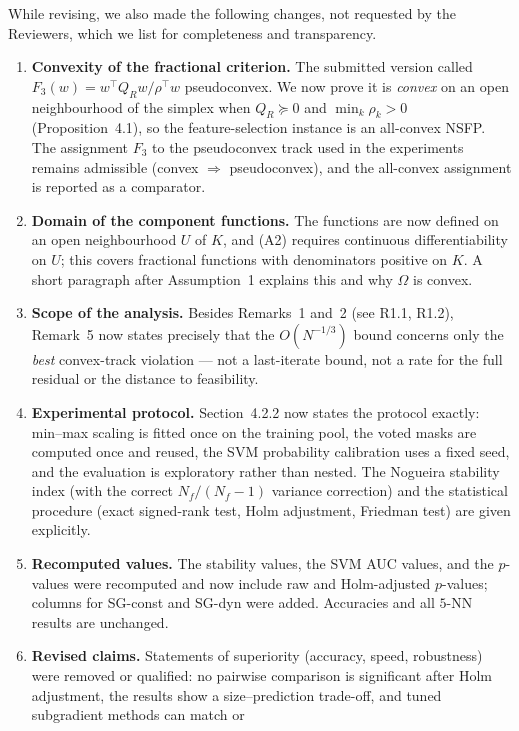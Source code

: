 \documentclass[11pt]{article}
\begin{document}
\noindent While revising, we also made the following changes, not requested by the
Reviewers, which we list for completeness and transparency.
\begin{enumerate}[leftmargin=1.6em,itemsep=3pt]
\item \textbf{Convexity of the fractional criterion.} The submitted version called
  $F_3(w)=w^{\top}Q_Rw/\rho^{\top}w$ pseudoconvex. We now prove it is \emph{convex} on an
  open neighbourhood of the simplex when $Q_R\succeq0$ and $\min_k\rho_k>0$
  (Proposition~4.1), so the feature-selection instance is an all-convex NSFP. The
  assignment $F_3$ to the pseudoconvex track used in the experiments remains admissible
  (convex $\Rightarrow$ pseudoconvex), and the all-convex assignment is reported as a
  comparator.
\item \textbf{Domain of the component functions.} The functions are now defined on an open
  neighbourhood $U$ of $K$, and (A2) requires continuous differentiability on $U$; this
  covers fractional functions with denominators positive on $K$. A short paragraph after
  Assumption~1 explains this and why $\Omega$ is convex.
\item \textbf{Scope of the analysis.} Besides Remarks~1 and~2 (see R1.1, R1.2), Remark~5
  now states precisely that the $O(N^{-1/3})$ bound concerns only the \emph{best}
  convex-track violation --- not a last-iterate bound, not a rate for the full residual or
  the distance to feasibility.
\item \textbf{Experimental protocol.} Section~4.2.2 now states the protocol exactly:
  min--max scaling is fitted once on the training pool, the voted masks are computed once
  and reused, the SVM probability calibration uses a fixed seed, and the evaluation is
  exploratory rather than nested. The Nogueira stability index (with the correct
  $N_f/(N_f-1)$ variance correction) and the statistical procedure (exact signed-rank
  test, Holm adjustment, Friedman test) are given explicitly.
\item \textbf{Recomputed values.} The stability values, the SVM AUC values, and the
  $p$-values were recomputed and now include raw and Holm-adjusted $p$-values; columns for
  SG-const and SG-dyn were added. Accuracies and all $5$-NN results are unchanged.
\item \textbf{Revised claims.} Statements of superiority (accuracy, speed, robustness)
  were removed or qualified: no pairwise comparison is significant after Holm adjustment,
  the results show a size--prediction trade-off, and tuned subgradient methods can match or

\end{enumerate}
\end{document}
